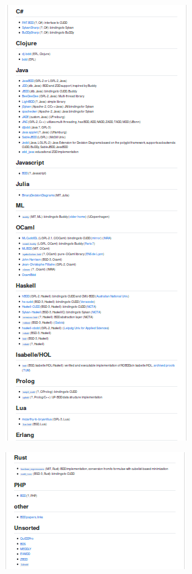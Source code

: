 \begin{container-fluid}
\begin{row-fluid}
\begin{span3}
\end{span3}
\begin{span3}
\includegraphics{img/static/bddlib3.png}
\end{span3}
\begin{span3}
\includegraphics{img/static/bddlib4.png}
\end{span3}
\end{row-fluid}
\end{container-fluid}

